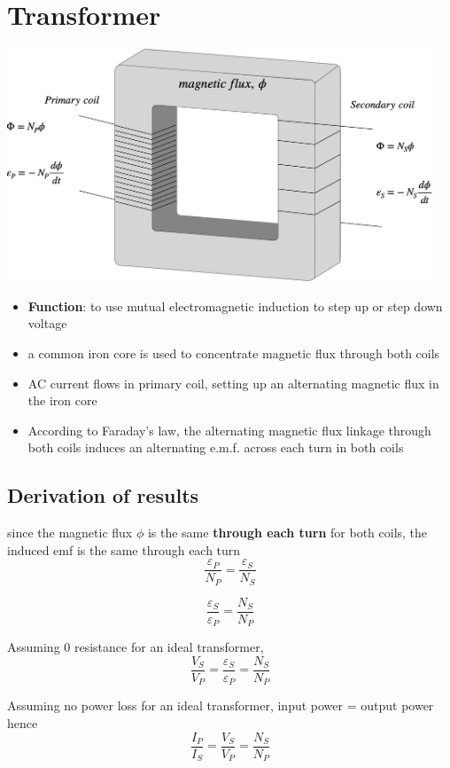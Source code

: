 \documentclass[a4paper, 10pt]{article}
\begin{document}
\section{Transformer}
\begin{center}
   \includegraphics[width=5in]{figures/2.pdf} 
\end{center}	
\begin{itemize}
   \item \textbf{Function}: to use mutual electromagnetic induction to step up or step down voltage
   \item a common iron core is used to concentrate magnetic flux through both coils
   \item AC current flows in primary coil, setting up an alternating magnetic flux in the iron core
   \item According to Faraday's law, the alternating magnetic flux linkage through both coils induces an alternating e.m.f. across each turn in both coils
\end{itemize}	

\subsection{Derivation of results}
since the magnetic flux $\phi$ is the same \textbf{through each turn} for both coils, the induced emf is the same through each turn
\[
\frac{\varepsilon_P}{N_P} = \frac{\varepsilon_S}{N_S} 
\]

\[
\frac{\varepsilon_S}{\varepsilon_P} = \frac{N_S}{N_P}
\] 

Assuming $0$ resistance for an ideal transformer,
\[
\frac{V_S}{V_P} = \frac{\varepsilon_S}{\varepsilon_P} = \frac{N_S}{N_P}
\]

Assuming no power loss for an ideal transformer, input power = output power hence
\[ 
   \frac{I_P}{I_S} = \frac{V_S}{V_P} = \frac{N_S}{N_P}
\]
\end{document}
